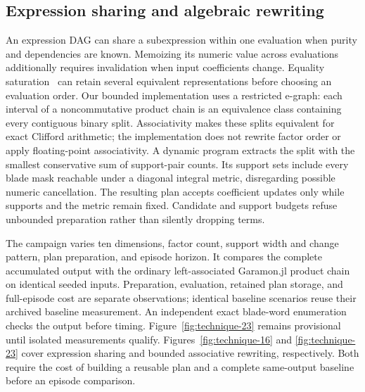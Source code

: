 \documentclass[11pt,a4paper]{article}
\begin{document}
\subsection{Expression sharing and algebraic rewriting}
An expression DAG can share a subexpression within one evaluation
when purity and dependencies are known. Memoizing its numeric value
across evaluations additionally requires invalidation when input
coefficients change. Equality saturation~\cite{egg} can retain several
equivalent representations before choosing an evaluation order. Our
bounded implementation uses a restricted e-graph: each interval of a
noncommutative product chain is an equivalence class containing every
contiguous binary split. Associativity makes these splits equivalent
for exact Clifford arithmetic; the implementation does not rewrite
factor order or apply floating-point associativity. A dynamic program
extracts the split with the smallest conservative sum of support-pair
counts. Its support sets include every blade mask reachable under a
diagonal integral metric, disregarding possible numeric cancellation.
The resulting plan accepts coefficient updates only while supports
and the metric remain fixed. Candidate and support budgets refuse
unbounded preparation rather than silently dropping terms.

The campaign varies ten dimensions, factor count, support width and
change pattern, plan preparation, and episode horizon. It compares
the complete accumulated output with the ordinary left-associated
Garamon.jl product chain on identical seeded inputs. Preparation,
evaluation, retained plan storage, and full-episode cost are separate
observations; identical baseline scenarios reuse their archived
baseline measurement. An independent exact blade-word enumeration
checks the output before timing. Figure~\ref{fig:technique-23}
remains provisional until isolated measurements qualify.
Figures~\ref{fig:technique-16} and \ref{fig:technique-23}
cover expression sharing and bounded associative rewriting,
respectively. Both require the cost of building a reusable plan
and a complete same-output baseline before an episode comparison.
\end{document}
